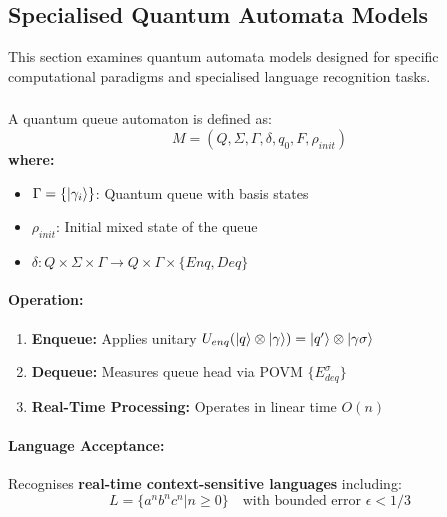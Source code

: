 \subsection{Specialised Quantum Automata Models}
\label{sec:specialised-qfa}

This section examines quantum automata models designed for specific computational paradigms and specialised language recognition tasks.

\subsubsection{}
\label{subsec:qqa}

\begin{definition}
A quantum queue automaton is defined as:
\[
M = (Q, \Sigma, \Gamma, \delta, q_0, F, \rho_{init})
\]
\textbf{where:}
\begin{itemize}
    \item $\Gamma = \{\ket{\gamma_i}\}$: Quantum queue with basis states
    \item $\rho_{init}$: Initial mixed state of the queue
    \item $\delta: Q \times \Sigma \times \Gamma \rightarrow Q \times \Gamma \times \{Enq, Deq\}$
\end{itemize}
\end{definition}

\paragraph{Operation:}
\begin{enumerate}
    \item \textbf{Enqueue:} Applies unitary $U_{enq}(\ket{q}\otimes\ket{\gamma}) = \ket{q'}\otimes\ket{\gamma\sigma}$
    \item \textbf{Dequeue:} Measures queue head via POVM $\{E_{deq}^\sigma\}$
    \item \textbf{Real-Time Processing:} Operates in linear time $O(n)$ \cite{yakaryilmaz2010succinctness}
\end{enumerate}

\paragraph{Language Acceptance:}
Recognises \textbf{real-time context-sensitive languages} including:
\[
L = \{a^nb^nc^n | n \geq 0\} \quad \text{with bounded error } \epsilon < 1/3
\]

